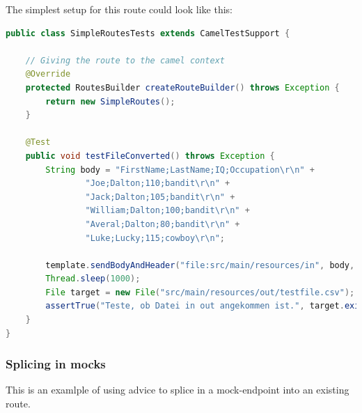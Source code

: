 The simplest setup for this route could look like this: 

\begin{lstlisting}[language=java]
public class SimpleRoutesTests extends CamelTestSupport {
	
	// Giving the route to the camel context
	@Override
	protected RoutesBuilder createRouteBuilder() throws Exception {
		return new SimpleRoutes();
	}
	
	@Test
	public void testFileConverted() throws Exception {
		String body = "FirstName;LastName;IQ;Occupation\r\n" + 
				"Joe;Dalton;110;bandit\r\n" + 
				"Jack;Dalton;105;bandit\r\n" + 
				"William;Dalton;100;bandit\r\n" + 
				"Averal;Dalton;80;bandit\r\n" + 
				"Luke;Lucky;115;cowboy\r\n";
		
		template.sendBodyAndHeader("file:src/main/resources/in", body, Exchange.FILE_NAME, "testfile.csv");
		Thread.sleep(1000);
		File target = new File("src/main/resources/out/testfile.csv");
		assertTrue("Teste, ob Datei in out angekommen ist.", target.exists());
	}
}
\end{lstlisting}


\subsubsection{Splicing in mocks}

This is an examlple of using advice to splice in a mock-endpoint into an existing route. 

